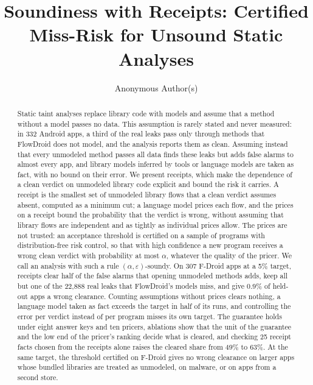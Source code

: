 \documentclass[acmsmall,screen,review,anonymous]{acmart}
\begin{document}
\title{Soundiness with Receipts: Certified Miss-Risk for Unsound Static Analyses}
\author{Anonymous Author(s)}
\renewcommand{\shortauthors}{Anonymous}

\begin{abstract}
Static taint analyses replace library code with models and assume that a method without a model passes no data.
This assumption is rarely stated and never measured: in 332 Android apps, a third of the real leaks pass only through methods that FlowDroid does not model, and the analysis reports them as clean.
Assuming instead that every unmodeled method passes all data finds these leaks but adds false alarms to almost every app, and library models inferred by tools or language models are taken as fact, with no bound on their error.
We present receipts, which make the dependence of a clean verdict on unmodeled library code explicit and bound the risk it carries.
A receipt is the smallest set of unmodeled library flows that a clean verdict assumes absent, computed as a minimum cut; a language model prices each flow, and the prices on a receipt bound the probability that the verdict is wrong, without assuming that library flows are independent and as tightly as individual prices allow.
The prices are not trusted: an acceptance threshold is certified on a sample of programs with distribution-free risk control, so that with high confidence a new program receives a wrong clean verdict with probability at most $\alpha$, whatever the quality of the pricer.
We call an analysis with such a rule $(\alpha,\varepsilon)$-soundy.
On 307 F-Droid apps at a 5\% target, receipts clear half of the false alarms that opening unmodeled methods adds, keep all but one of the 22{,}888 real leaks that FlowDroid's models miss, and give 0.9\% of held-out apps a wrong clearance.
Counting assumptions without prices clears nothing, a language model taken as fact exceeds the target in half of its runs, and controlling the error per verdict instead of per program misses its own target.
The guarantee holds under eight answer keys and ten pricers, ablations show that the unit of the guarantee and the low end of the pricer's ranking decide what is cleared, and checking 25 receipt facts chosen from the receipts alone raises the cleared share from 49\% to 63\%.
At the same target, the threshold certified on F-Droid gives no wrong clearance on larger apps whose bundled libraries are treated as unmodeled, on malware, or on apps from a second store.
\end{abstract}
\end{document}
